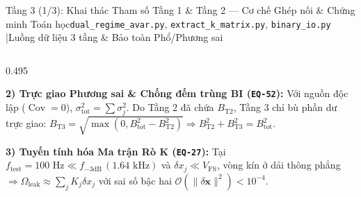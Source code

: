 \documentclass[aspectratio=169,8pt]{beamer}
\begin{document}
\begin{frame}{Tầng 3 (1/3): Khai thác Tham số Tầng 1 \& Tầng 2 — Cơ chế Ghép nối \& Chứng minh Toán học}{\texttt{dual\_regime\_avar.py}, \texttt{extract\_k\_matrix.py}, \texttt{binary\_io.py} \enspace|\enspace Luồng dữ liệu 3 tầng \& Bảo toàn Phổ/Phương sai}
\begin{columns}[T]
\begin{column}{0.495\textwidth}
\begin{remarkbox}
{      \vspace{2.5pt}
      \textbf{2) Trực giao Phương sai \& Chống đếm trùng BI (\texttt{EQ-52}):}
      Với nguồn độc lập ($\operatorname{Cov}=0$), $\sigma_{\text{tot}}^2=\sum\sigma_j^2$. Do Tầng 2 đã chứa $B_{\text{T2}}$, Tầng 3 chỉ bù phần dư trực giao:
      $B_{\text{T3}}=\sqrt{\max(0,B_{\text{tot}}^2-B_{\text{T2}}^2)} \Rightarrow B_{\text{T2}}^2+B_{\text{T3}}^2=B_{\text{tot}}^2$.

      \vspace{2.5pt}
      \textbf{3) Tuyến tính hóa Ma trận Rò $\mathbf{K}$ (\texttt{EQ-27}):}
      Tại $f_{\text{test}}=100\text{ Hz}\ll f_{-3\text{dB}}\,(1.64\text{ kHz})$ và $\delta x_j\ll V_{\text{FS}}$, vòng kín ở dải thông phẳng $\Rightarrow \Omega_{\text{leak}}\approx\sum_j K_j\delta x_j$ với sai số bậc hai $\mathcal{O}(\|\delta\mathbf{x}\|^2)<10^{-4}$.}
    \end{remarkbox}
  \end{column}
\end{columns}
\end{frame}
\end{document}
